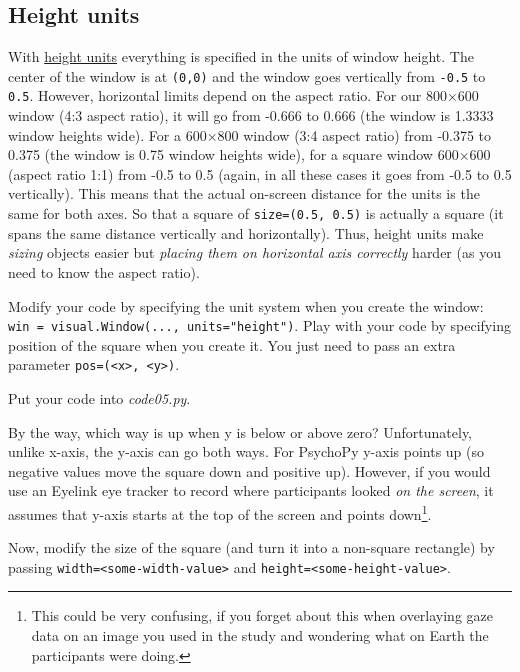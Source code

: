 \documentclass[
]{book}
\begin{document}
\hypertarget{psychopy-units-height}{%
\subsection{Height units}\label{psychopy-units-height}}

With \href{https://psychopy.org/general/units.html\#height-units}{height units} everything is specified in the units of window height. The center of the window is at \texttt{(0,0)} and the window goes vertically from \texttt{-0.5} to \texttt{0.5}. However, horizontal limits depend on the aspect ratio. For our 800×600 window (4:3 aspect ratio), it will go from -0.666 to 0.666 (the window is 1.3333 window heights wide). For a 600×800 window (3:4 aspect ratio) from -0.375 to 0.375 (the window is 0.75 window heights wide), for a square window 600×600 (aspect ratio 1:1) from -0.5 to 0.5 (again, in all these cases it goes from -0.5 to 0.5 vertically). This means that the actual on-screen distance for the units is the same for both axes. So that a square of \texttt{size=(0.5,\ 0.5)} is actually a square (it spans the same distance vertically and horizontally). Thus, height units make \emph{sizing} objects easier but \emph{placing them on horizontal axis correctly} harder (as you need to know the aspect ratio).

Modify your code by specifying the unit system when you create the window: \texttt{win\ =\ visual.Window(...,\ units="height")}. Play with your code by specifying position of the square when you create it. You just need to pass an extra parameter \texttt{pos=(\textless{}x\textgreater{},\ \textless{}y\textgreater{})}.

Put your code into \emph{code05.py}.

By the way, which way is up when y is below or above zero? Unfortunately, unlike x-axis, the y-axis can go both ways. For PsychoPy y-axis points up (so negative values move the square down and positive up). However, if you would use an Eyelink eye tracker to record where participants looked \emph{on the screen}, it assumes that y-axis starts at the top of the screen and points down\footnote{This could be very confusing, if you forget about this when overlaying gaze data on an image you used in the study and wondering what on Earth the participants were doing.}.

Now, modify the size of the square (and turn it into a non-square rectangle) by passing \texttt{width=\textless{}some-width-value\textgreater{}} and \texttt{height=\textless{}some-height-value\textgreater{}}.
\end{document}
